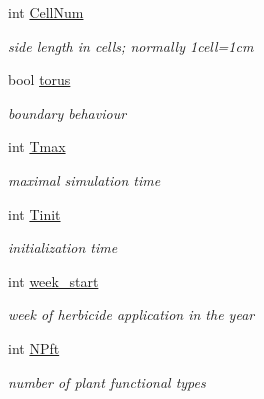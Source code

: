 \begin{DoxyCompactItemize}
\mbox{\label{struct_s_run_para_ad2804a9533c7cb66fa5d9821d473133d}} 
int \mbox{\hyperlink{struct_s_run_para_ad2804a9533c7cb66fa5d9821d473133d}{Cell\+Num}}
\begin{DoxyCompactList}\small\item\em side length in cells; normally 1cell=1cm \end{DoxyCompactList}\item 
\mbox{\label{struct_s_run_para_a5263aaa9db4f6fef014ba59f734ee79f}} 
bool \mbox{\hyperlink{struct_s_run_para_a5263aaa9db4f6fef014ba59f734ee79f}{torus}}
\begin{DoxyCompactList}\small\item\em boundary behaviour \end{DoxyCompactList}\item 
\mbox{\label{struct_s_run_para_a94a7d9a7401f8b65b9a2622a3d7d9ea2}} 
int \mbox{\hyperlink{struct_s_run_para_a94a7d9a7401f8b65b9a2622a3d7d9ea2}{Tmax}}
\begin{DoxyCompactList}\small\item\em maximal simulation time \end{DoxyCompactList}\item 
\mbox{\label{struct_s_run_para_a53fb7524510bfb7c62897a2c49c0b0cf}} 
int \mbox{\hyperlink{struct_s_run_para_a53fb7524510bfb7c62897a2c49c0b0cf}{Tinit}}
\begin{DoxyCompactList}\small\item\em initialization time \end{DoxyCompactList}\item 
\mbox{\label{struct_s_run_para_a4890726d20d225767a9cb5ff226c2690}} 
int \mbox{\hyperlink{struct_s_run_para_a4890726d20d225767a9cb5ff226c2690}{week\+\_\+start}}
\begin{DoxyCompactList}\small\item\em week of herbicide application in the year \end{DoxyCompactList}\item 
\mbox{\label{struct_s_run_para_a69bd9832725caf0a38f697786fe561fb}} 
int \mbox{\hyperlink{struct_s_run_para_a69bd9832725caf0a38f697786fe561fb}{N\+Pft}}
\begin{DoxyCompactList}\small\item\em number of plant functional types \end{DoxyCompactList}\item 

\end{DoxyCompactItemize}
